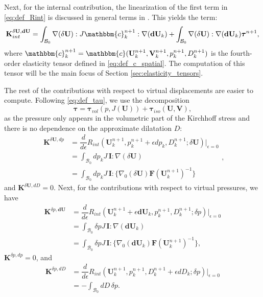 \documentclass{sfuthesis}
\numberwithin{equation}{section}
\numberwithin{figure}{chapter}
\numberwithin{table}{chapter}
\theoremstyle{definition}
\def\*#1{{\mathbf{#1}}} %
\newcommand{\der}[2]{\dfrac{d #1}{d #2}}
\newcommand{\B}{\mathcal{B}}
\renewcommand{\c}{\mathbbm{c}}
\def\btau{{\bm{\tau}}}
\begin{document}
Next, for the internal contribution, the linearization of the first term in \eqref{eq:def_Rint} is discussed in general terms in \cite[Chapter 8]{HolzapfelBook}. This yields the term:
\begin{equation} \label{eq:def_K_int_11}
    \*K_{int}^{\delta \*U, \*d \*U} = \int_{\B_0} \nabla (\delta \*U) : J\c^{n+1}_k : \nabla(\*d\*U_k) + \int_{\B_0} \nabla(\delta \*U) : \nabla (\*d\*U_k) \btau^{n+1},
\end{equation}
where $\c^{n+1}_k = \c(\*U^{n+1}_k, \*V^{n+1}_k, p^{n+1}_k, D^{n+1}_k)$ is the fourth-order elasticity tensor defined in \eqref{eq:def_c_spatial}. The computation of this tensor will be the main focus of Section \ref{sec:elasticity_tensors}.

The rest of the contributions with respect to virtual displacements are easier to compute. Following \eqref{eq:def_tau}, we use the decomposition 
\begin{equation}
    \btau = \btau_{vol}(p,J(\*U)) + \btau_{iso}(\*U,\*V),
\end{equation}
as the pressure only appears in the volumetric part of the Kirchhoff stress and there is no dependence on the approximate dilatation $D$:
\begin{equation}
\begin{aligned}
\*K^{\delta \*U, dp} &= \der{}{\epsilon} R_{int}(\*U^{n+1}_k, p^{n+1}_k + \epsilon dp_k, D^{n+1}_k; \delta\*U) \Big|_{\epsilon=0} \\
&= \int_{\B_0} dp_k J \, \*I : \nabla(\delta\*U) \\
&= \int_{\B_0} dp_k J \, \*I : \Big\{ \nabla_0(\delta\*U) \*F(\*U^{n+1}_k)^{-1} \Big\}
\end{aligned},
\end{equation}
and $\*K^{\delta\*U, dD} = 0$. Next, for the contributions with respect to virtual pressures, we have
\begin{equation}
\begin{aligned}
\*K^{\delta p, \*d\*U} &= \der{}{\epsilon} R_{int}(\*U^{n+1}_k + \epsilon \*d\*U_k, p^{n+1}_k, D^{n+1}_k ; \delta p) \Big|_{\epsilon=0} \\
&= \int_{\B_0} \delta p J \, \*I : \nabla (\*d\*U_k) \\
&= \int_{\B_0} \delta p J \, \*I : \Big\{ \nabla_0 (\*d\*U_k) \*F(\*U^{n+1}_k)^{-1} \Big\},
\end{aligned}
\end{equation}
$\*K^{\delta p, dp} = 0$, and
\begin{equation}
\begin{aligned}
\*K^{\delta p, dD} &= \der{}{\epsilon}R_{int}(\*U^{n+1}_k, p^{n+1}_k, D^{n+1}_k + \epsilon dD_k ; \delta p) \Big|_{\epsilon=0} \\
&= - \int_{\B_0} dD \, \delta p.
\end{aligned}
\end{equation}
\end{document}
